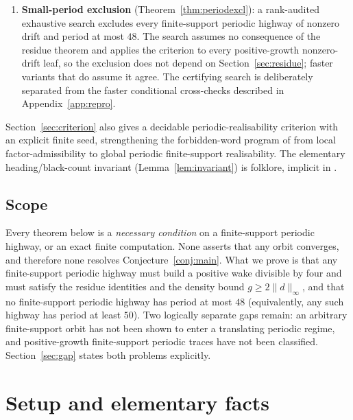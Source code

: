 \documentclass[11pt,reqno]{amsart}
\theoremstyle{plain}
\theoremstyle{definition}
\newcommand{\drift}{d}
\newcommand{\growth}{g}
\begin{document}
\begin{enumerate}[leftmargin=2.4em,label=\textbf{(\arabic*)}]
\item \textbf{Small-period exclusion} (Theorem~\ref{thm:periodexcl}): a rank-audited
exhaustive search excludes every finite-support periodic highway of nonzero drift and
period at most $48$. The search assumes no consequence of the residue theorem and
applies the criterion to every positive-growth nonzero-drift leaf, so the exclusion
does not depend on Section~\ref{sec:residue}; faster variants that do assume it agree.
The certifying search is deliberately separated from the faster conditional
cross-checks described in Appendix~\ref{app:repro}.
\end{enumerate}

Section~\ref{sec:criterion} also gives a decidable periodic-realisability criterion
with an explicit finite seed, strengthening the forbidden-word program of
\cite{Gajardo2003symbolic} from local factor-admissibility to global periodic
finite-support realisability. The
elementary heading/black-count invariant (Lemma~\ref{lem:invariant}) is folklore,
implicit in \cite{BunimovichTroubetzkoy1992,GaleProppSutnerTroubetzkoy1995}.

\subsection{Scope}
Every theorem below is a \emph{necessary condition} on a finite-support periodic
highway, or an exact finite computation. None asserts that any orbit converges, and
therefore none resolves Conjecture~\ref{conj:main}. What we prove is that any
finite-support periodic highway must build a positive wake divisible by four and must
satisfy the residue identities and the density bound $\growth\ge2\|\drift\|_\infty$,
and that no finite-support periodic highway has period at most $48$ (equivalently, any
such highway has period at least $50$). Two logically separate gaps remain: an
arbitrary finite-support orbit has not been shown to enter a translating periodic
regime, and positive-growth finite-support periodic traces have not been classified.
Section~\ref{sec:gap} states both problems explicitly.

\section{Setup and elementary facts}\label{sec:setup}
\end{document}
